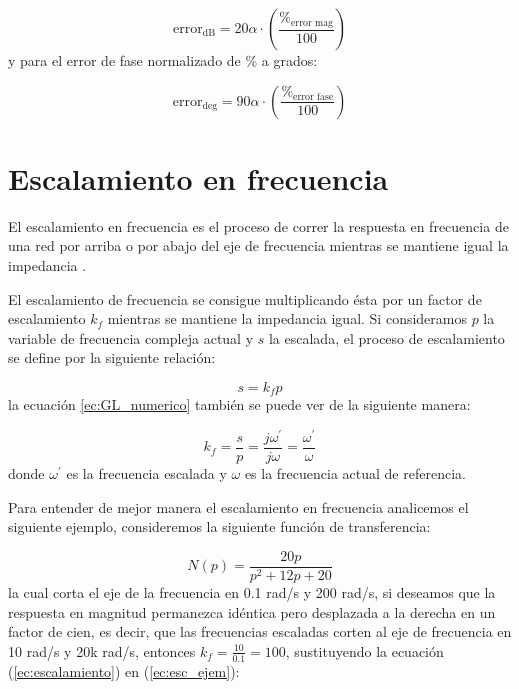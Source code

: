 	\begin{equation}
	\mathrm{error}_{\mathrm{dB}} =  20 \alpha \cdot \left( \frac{\%_{\mathrm{error\,\,mag}}}{100} \right)
	\end{equation}
	y para el error de fase normalizado de \% a grados:
	
	\begin{equation}
	\mathrm{error}_{\mathrm{deg}} = 90 \alpha \cdot \left( \frac{\%_{\mathrm{error\,\,fase}}}{100} \right) 
	\end{equation}
	                                                                 
	\section{Escalamiento en frecuencia}
	
	El escalamiento en frecuencia es el proceso de correr la respuesta en frecuencia de una red por arriba o por abajo del eje de frecuencia mientras  se mantiene igual la impedancia \cite{CharlesAlexander2016}.
	
	El escalamiento de frecuencia se consigue multiplicando ésta por un factor de escalamiento $k_{f}$ mientras se mantiene la impedancia igual. Si consideramos $p$ la variable de frecuencia compleja actual y $s$ la escalada, el proceso de escalamiento se define por la siguiente relación:
	
	\begin{equation}
	s = k_{f} p
	\label{ec:escalamiento}
	\end{equation}
	la ecuación \ref{ec:GL_numerico} también se puede ver de la siguiente manera:
	
	\begin{equation}
	k_{f} = \frac{s}{p} = \frac{j \omega^{'}}{j \omega} = \frac{\omega^{'}}{\omega}
	\end{equation}
	donde $\omega^{'}$ es la frecuencia escalada y $\omega$ es la frecuencia actual de referencia.
	
	Para entender de mejor manera el escalamiento en frecuencia analicemos el siguiente ejemplo, consideremos la siguiente función de transferencia:
	
	\begin{equation}
	N(p) = \frac{20p}{p^{2} + 12p + 20}
	\label{ec:esc_ejem}
	\end{equation}
	la cual corta el eje de la frecuencia en 0.1 rad/s y 200 rad/s, si deseamos que la respuesta en magnitud permanezca idéntica pero desplazada a la derecha en un factor de cien, es decir, que las frecuencias escaladas corten al eje de frecuencia en 10 rad/s y 20k rad/s, entonces $k_{f} = \frac{10}{0.1} = 100$, sustituyendo la ecuación (\ref{ec:escalamiento}) en (\ref{ec:esc_ejem}):

